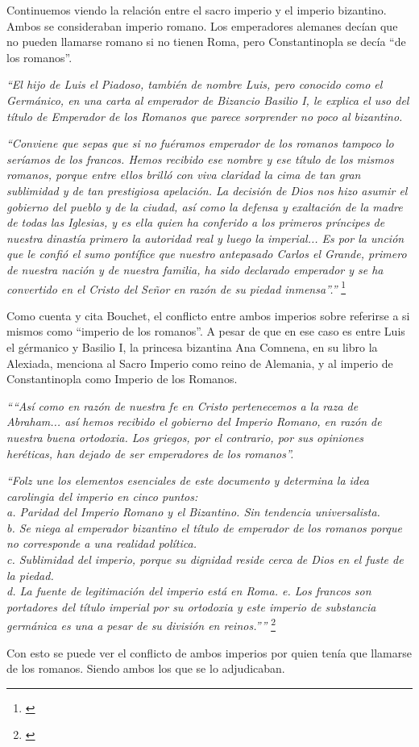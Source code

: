 Continuemos viendo la relación entre el sacro imperio y
el imperio bizantino. Ambos se consideraban imperio romano.
Los emperadores alemanes decían que no pueden llamarse romano
si no tienen Roma, pero Constantinopla se decía ``de los
romanos''.

\textit{``El hijo de Luis el Piadoso, también de nombre Luis,
	pero conocido como el Germánico, en una carta al
	emperador de Bizancio Basilio I, le explica el uso del
	título de Emperador de los Romanos que parece sorprender
	no poco al bizantino.}

\textit{``Conviene que sepas que si no fuéramos emperador de los
	romanos tampoco lo seríamos de los francos. Hemos recibido
	ese nombre y ese título de los mismos romanos, porque
	entre ellos brilló con viva claridad la cima de tan gran
	sublimidad y de tan prestigiosa apelación.
	La decisión de Dios nos hizo asumir el gobierno del pueblo
	y de la ciudad, así como la defensa y exaltación de la madre
	de todas las Iglesias, y es ella quien ha conferido a los
	primeros príncipes de nuestra dinastía primero la autoridad
	real y luego la imperial...
	Es por la unción que le confió el sumo pontífice que
	nuestro antepasado Carlos el Grande, primero de nuestra
	nación y de nuestra familia, ha sido declarado emperador
	y se ha convertido en el Cristo del Señor en razón
	de su piedad inmensa''.''}
\footnote{\cite[p.~846]{ciudad}}

Como cuenta y cita Bouchet, el conflicto entre ambos imperios
sobre referirse a si mismos como ``imperio de los romanos''.
A pesar de que en ese caso es entre Luis el gérmanico y
Basilio I, la princesa bizantina Ana Comnena, en su libro
la Alexiada, menciona al Sacro Imperio como reino de Alemania,
y al imperio de Constantinopla como Imperio de los Romanos.

\textit{
	````Así como en razón de nuestra fe en Cristo pertenecemos
	a la raza de Abraham... así hemos recibido el gobierno del
	Imperio Romano, en razón de nuestra buena ortodoxia.
	Los griegos, por el contrario, por sus opiniones heréticas,
	han dejado de ser emperadores de los romanos''.}

\textit{
	``Folz une los elementos esenciales de este documento
	y determina la idea carolingia del imperio
	en cinco puntos:\\
	a. Paridad del Imperio Romano y el Bizantino. Sin
	tendencia universalista.\\
	b. Se niega al emperador bizantino el título de emperador
	de los romanos porque no corresponde a una realidad política.\\
	c. Sublimidad del imperio, porque su dignidad reside cerca de
	Dios en el fuste de la piedad.\\
	d. La fuente de legitimación del imperio está en Roma.
	e. Los francos son portadores del título imperial por su
	ortodoxia y este imperio de substancia germánica es una a
	pesar de su división en reinos.''''}
\footnote{\cite[p.~846-847]{ciudad}}

Con esto se puede ver el conflicto de ambos imperios por
quien tenía que llamarse de los romanos. Siendo ambos los
que se lo adjudicaban.


















